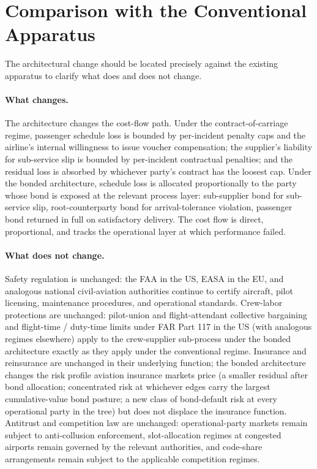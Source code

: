 \documentclass[11pt,a4paper]{article}
\theoremstyle{definition}
\theoremstyle{remark}
\begin{document}
\section{Comparison with the Conventional Apparatus}
\label{sec:comparison}

The architectural change should be located precisely against the
existing apparatus to clarify what does and does not change.

\paragraph{What changes.}
The architecture changes the cost-flow path. Under the
contract-of-carriage regime, passenger schedule loss is bounded
by per-incident penalty caps and the airline's internal
willingness to issue voucher compensation; the supplier's
liability for sub-service slip is bounded by per-incident
contractual penalties; and the residual loss is absorbed by
whichever party's contract has the loosest cap. Under the bonded
architecture, schedule loss is allocated proportionally to the
party whose bond is exposed at the relevant process layer:
sub-supplier bond for sub-service slip, root-counterparty bond
for arrival-tolerance violation, passenger bond returned in full
on satisfactory delivery. The cost flow is direct, proportional,
and tracks the operational layer at which performance failed.

\paragraph{What does not change.}
Safety regulation is unchanged: the FAA in the US, EASA in the
EU, and analogous national civil-aviation authorities continue to
certify aircraft, pilot licensing, maintenance procedures, and
operational standards. Crew-labor protections are unchanged:
pilot-union and flight-attendant collective bargaining and
flight-time / duty-time limits under FAR Part 117 in the US (with
analogous regimes elsewhere) apply to the crew-supplier
sub-process under the bonded architecture exactly as they apply
under the conventional regime. Insurance and reinsurance are
unchanged in their underlying function; the bonded architecture
changes the risk profile aviation insurance markets price (a
smaller residual after bond allocation; concentrated risk at
whichever edges carry the largest cumulative-value bond posture;
a new class of bond-default risk at every operational party in
the tree) but does not displace the insurance function. Antitrust
and competition law are unchanged: operational-party markets
remain subject to anti-collusion enforcement, slot-allocation
regimes at congested airports remain governed by the relevant
authorities, and code-share arrangements remain subject to the
applicable competition regimes.
\end{document}
